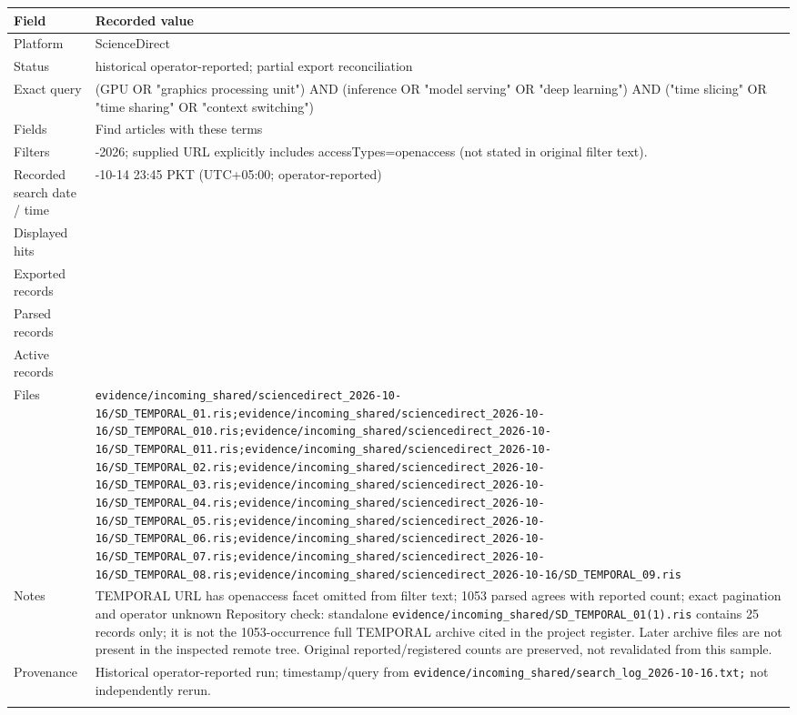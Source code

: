 \begin{longtable}{>{\raggedright\arraybackslash}p{}>{\raggedright\arraybackslash}p{}}
\toprule
\textbf{Field} & \textbf{Recorded value}\\\midrule\endhead
Platform & ScienceDirect\\\addlinespace
Status & historical operator-reported; partial export reconciliation\\\addlinespace
Exact query & (GPU OR "graphics processing unit") AND (inference OR "model serving" OR "deep learning") AND ("time slicing" OR "time sharing" OR "context switching")\\\addlinespace
Fields & Find articles with these terms\\\addlinespace
Filters & 2020-2026; supplied URL explicitly includes accessTypes=openaccess (not stated in original filter text).\\\addlinespace
Recorded search date / time & 2026-10-14 23:45 PKT (UTC+05:00; operator-reported)\\\addlinespace
Displayed hits & 1053\\\addlinespace
Exported records & 1053\\\addlinespace
Parsed records & 1053\\\addlinespace
Active records & 1053\\\addlinespace
Files & \nolinkurl{evidence/incoming_shared/sciencedirect_2026-10-16/SD_TEMPORAL_01.ris;evidence/incoming_shared/sciencedirect_2026-10-16/SD_TEMPORAL_010.ris;evidence/incoming_shared/sciencedirect_2026-10-16/SD_TEMPORAL_011.ris;evidence/incoming_shared/sciencedirect_2026-10-16/SD_TEMPORAL_02.ris;evidence/incoming_shared/sciencedirect_2026-10-16/SD_TEMPORAL_03.ris;evidence/incoming_shared/sciencedirect_2026-10-16/SD_TEMPORAL_04.ris;evidence/incoming_shared/sciencedirect_2026-10-16/SD_TEMPORAL_05.ris;evidence/incoming_shared/sciencedirect_2026-10-16/SD_TEMPORAL_06.ris;evidence/incoming_shared/sciencedirect_2026-10-16/SD_TEMPORAL_07.ris;evidence/incoming_shared/sciencedirect_2026-10-16/SD_TEMPORAL_08.ris;evidence/incoming_shared/sciencedirect_2026-10-16/SD_TEMPORAL_09.ris}\\\addlinespace
Notes & TEMPORAL URL has openaccess facet omitted from filter text; 1053 parsed agrees with reported count; exact pagination and operator unknown Repository check: standalone \nolinkurl{evidence/incoming_shared/SD_TEMPORAL_01(1).ris} contains 25 records only; it is not the 1053-occurrence full TEMPORAL archive cited in the project register. Later archive files are not present in the inspected remote tree. Original reported/registered counts are preserved, not revalidated from this sample.\\\addlinespace
Provenance & Historical operator-reported run; timestamp/query from \nolinkurl{evidence/incoming_shared/search_log_2026-10-16.txt;} not independently rerun.\\\addlinespace
\bottomrule\end{longtable}


